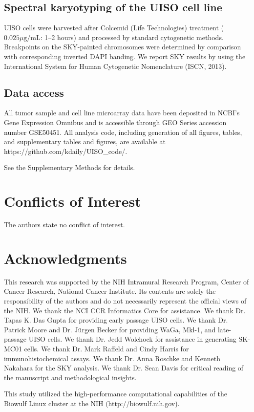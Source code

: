 \documentclass[10pt]{article}
\begin{document}
\subsection*{Spectral karyotyping of the UISO cell line}
UISO cells were harvested after Colcemid (Life Technologies) treatment ($0.025 \mu\textrm{g/mL}$: 1–2 hours) and processed by standard cytogenetic methods.
Breakpoints on the SKY-painted chromosomes were determined by comparison with corresponding inverted DAPI banding.
We report SKY results by using the International System for Human Cytogenetic Nomenclature (ISCN, 2013).

\subsection*{Data access}
All tumor sample and cell line microarray data have been deposited in NCBI's Gene Expression Omnibus \citep{Edgar2002Gene} and is accessible through GEO Series accession number GSE50451.
All analysis code, including generation of all figures, tables, and supplementary tables and figures, are available at https://github.com/kdaily/UISO\_code/.

See the Supplementary Methods for details.

\section*{Conflicts of Interest}
The authors state no conflict of interest.

\section*{Acknowledgments}
This research was supported by the NIH Intramural Research Program, Center of Cancer Research, National Cancer Institute.
Its contents are solely the responsibility of the authors and do not necessarily represent the official views of the NIH.
We thank the NCI CCR Informatics Core for assistance.
We thank Dr. Tapas K. Das Gupta for providing early passage UISO cells.
We thank Dr. Patrick Moore and Dr. J\"{u}rgen Becker for providing WaGa, Mkl-1, and late-passage UISO cells.
We thank Dr. Jedd Wolchock for assistance in generating SK-MC01 cells.
We thank Dr. Mark Raffeld and Cindy Harris for immunohistochemical assays.
We thank Dr. Anna Roschke and Kenneth Nakahara for the SKY analysis.
We thank Dr. Sean Davis for critical reading of the manuscript and methodological insights.

This study utilized the high-performance computational capabilities of the Biowulf Linux cluster at the NIH (http://biowulf.nih.gov).
\end{document}
